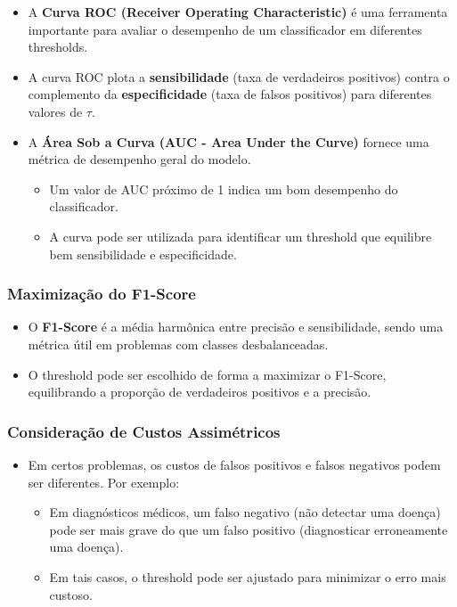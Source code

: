 \documentclass{sciposter}
\begin{document}
\begin{multicols}{3}
\begin{itemize}
    \item A \textbf{Curva ROC (Receiver Operating Characteristic)} é uma ferramenta importante para avaliar o desempenho de um classificador em diferentes thresholds.
    \item A curva ROC plota a \textbf{sensibilidade} (taxa de verdadeiros positivos) contra o complemento da \textbf{especificidade} (taxa de falsos positivos) para diferentes valores de $\tau$.
    \item A \textbf{Área Sob a Curva (AUC - Area Under the Curve)} fornece uma métrica de desempenho geral do modelo.
    \begin{itemize}
        \item Um valor de AUC próximo de 1 indica um bom desempenho do classificador.
        \item A curva pode ser utilizada para identificar um threshold que equilibre bem sensibilidade e especificidade.
    \end{itemize}
\end{itemize}

\subsubsection{Maximização do F1-Score}

\begin{itemize}
    \item O \textbf{F1-Score} é a média harmônica entre precisão e sensibilidade, sendo uma métrica útil em problemas com classes desbalanceadas.
    \item O threshold pode ser escolhido de forma a maximizar o F1-Score, equilibrando a proporção de verdadeiros positivos e a precisão.
\end{itemize}

\subsubsection{Consideração de Custos Assimétricos}

\begin{itemize}
    \item Em certos problemas, os custos de falsos positivos e falsos negativos podem ser diferentes. Por exemplo:
    \begin{itemize}
        \item Em diagnósticos médicos, um falso negativo (não detectar uma doença) pode ser mais grave do que um falso positivo (diagnosticar erroneamente uma doença).
        \item Em tais casos, o threshold pode ser ajustado para minimizar o erro mais custoso.
    \end{itemize}
\end{itemize}


\end{multicols}
\end{document}
